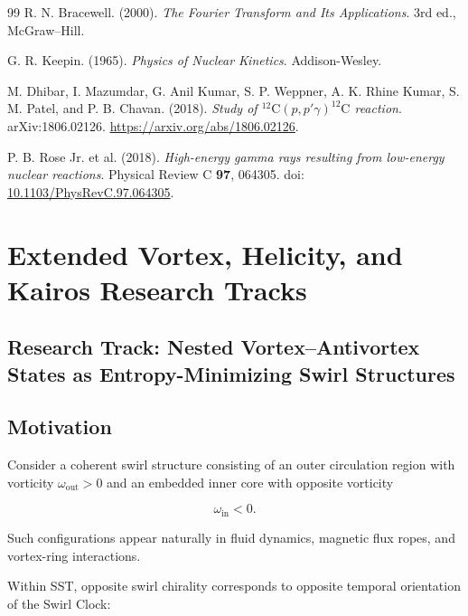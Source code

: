 \begin{thebibliography}{99}
        R. N. Bracewell. (2000).
        \textit{The Fourier Transform and Its Applications}.
        3rd ed., McGraw--Hill.
        
        G. R. Keepin. (1965).
        \textit{Physics of Nuclear Kinetics}.
        Addison-Wesley.
        
        M. Dhibar, I. Mazumdar, G. Anil Kumar, S. P. Weppner, A. K. Rhine Kumar, S. M. Patel, and P. B. Chavan. (2018).
        \textit{Study of \(^{12}\mathrm C(p,p'\gamma)^{12}\mathrm C\) reaction}.
        arXiv:1806.02126.
        \href{https://arxiv.org/abs/1806.02126}{https://arxiv.org/abs/1806.02126}.
        
        P. B. Rose Jr. et al. (2018).
        \textit{High-energy gamma rays resulting from low-energy nuclear reactions}.
        Physical Review C \textbf{97}, 064305.
        doi: \href{https://doi.org/10.1103/PhysRevC.97.064305}{10.1103/PhysRevC.97.064305}.
    
    \end{thebibliography}
\fi




\section{Extended Vortex, Helicity, and Kairos Research Tracks}

\subsection{Research Track: Nested Vortex--Antivortex States as Entropy-Minimizing Swirl Structures}
    
    \subsection{Motivation}
        
        Consider a coherent swirl structure consisting of an outer circulation region
        with vorticity $\omega_{\mathrm{out}}>0$ and an embedded inner core with
        opposite vorticity
        
        \[
            \omega_{\mathrm{in}}<0.
        \]
        
        Such configurations appear naturally in fluid dynamics, magnetic flux ropes,
        and vortex-ring interactions.
        
        Within SST, opposite swirl chirality corresponds to opposite temporal
        orientation of the Swirl Clock:
        
